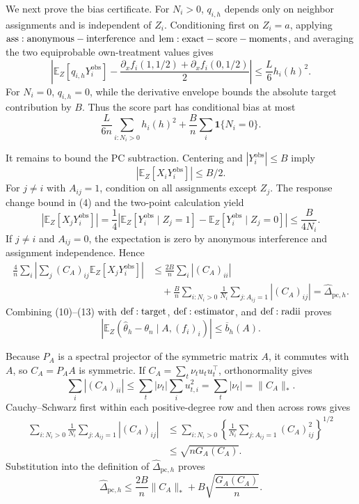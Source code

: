 We next prove the bias certificate.  For \(N_i>0\), \(q_{i,h}\) depends only on neighbor assignments and is independent of \(Z_i\).  Conditioning first on \(Z_i=a\), applying \({\rm ass:anonymous-interference}\) and \({\rm lem:exact-score-moments}\), and averaging the two equiprobable own-treatment values gives
\[
 \left|\mathbb E_Z[q_{i,h}Y_i^{\mathrm{obs}}]
 -\frac{\partial_xf_i(1,1/2)+\partial_xf_i(0,1/2)}2\right|
 \leq\frac L6h_i(h)^2.
\tag{9}
\]
For \(N_i=0\), \(q_{i,h}=0\), while the derivative envelope bounds the absolute target contribution by \(B\).  Thus the score part has conditional bias at most
\[
 \frac{L}{6n}\sum_{i:N_i>0}h_i(h)^2
 +\frac Bn\sum_i\mathbf1\{N_i=0\}.
\tag{10}
\]

It remains to bound the PC subtraction.  Centering and \(|Y_i^{\mathrm{obs}}|\leq B\) imply
\[
 |\mathbb E_Z[X_iY_i^{\mathrm{obs}}]|\leq B/2.
\tag{11}
\]
For \(j\ne i\) with \(A_{ij}=1\), condition on all assignments except \(Z_j\).  The response change bound in (4) and the two-point calculation yield
\[
 |\mathbb E_Z[X_jY_i^{\mathrm{obs}}]|
 =\frac14\left|\mathbb E_Z[Y_i^{\mathrm{obs}}\mid Z_j=1]
 -\mathbb E_Z[Y_i^{\mathrm{obs}}\mid Z_j=0]\right|
 \leq\frac B{4N_i}.
\tag{12}
\]
If \(j\ne i\) and \(A_{ij}=0\), the expectation is zero by anonymous interference and assignment independence.  Hence
\[
\begin{aligned}
 \frac4n\sum_i\left|\sum_j(C_A)_{ij}\mathbb E_Z[X_jY_i^{\mathrm{obs}}]\right|
 &\leq\frac{2B}{n}\sum_i|(C_A)_{ii}|\\
 &\quad+\frac Bn\sum_{i:N_i>0}\frac1{N_i}\sum_{j:A_{ij}=1}|(C_A)_{ij}|
 =\widehat\Delta_{\mathrm{pc},h}.
\end{aligned}
\tag{13}
\]
Combining (10)--(13) with \({\rm def:target}\), \({\rm def:estimator}\), and \({\rm def:radii}\) proves
\[
 \left|\mathbb E_Z(\widehat\theta_h-\theta_n\mid A,(f_i)_i)\right|
 \leq\overline b_h(A).
\tag{14}
\]

Because \(P_A\) is a spectral projector of the symmetric matrix \(A\), it commutes with \(A\), so \(C_A=P_AA\) is symmetric.  If \(C_A=\sum_t\nu_tu_tu_t^\top\), orthonormality gives
\[
 \sum_i|(C_A)_{ii}|
 \leq\sum_t|\nu_t|\sum_i u_{t,i}^2=\sum_t|\nu_t|=\|C_A\|_*.
\tag{15}
\]
Cauchy--Schwarz first within each positive-degree row and then across rows gives
\[
\begin{aligned}
 \sum_{i:N_i>0}\frac1{N_i}\sum_{j:A_{ij}=1}|(C_A)_{ij}|
 &\leq\sum_{i:N_i>0}
 \left\{\frac1{N_i}\sum_{j:A_{ij}=1}(C_A)_{ij}^2\right\}^{1/2}\\
 &\leq\sqrt{nG_A(C_A)}.
\end{aligned}
\tag{16}
\]
Substitution into the definition of \(\widehat\Delta_{\mathrm{pc},h}\) proves
\[
 \widehat\Delta_{\mathrm{pc},h}
 \leq\frac{2B}{n}\|C_A\|_*+B\sqrt{\frac{G_A(C_A)}n}.
\tag{17}
\]

